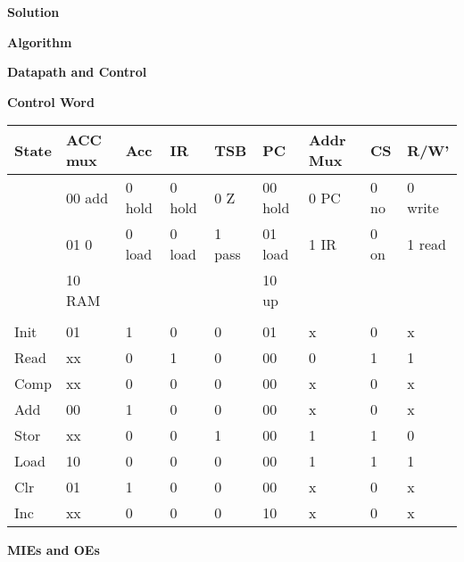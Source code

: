 \begin{enumerate}
\begin{onlysolution}  \textbf{Solution} \itshape{ 

\textbf{ Algorithm}

\textbf{ Datapath and Control}

\begin{figure}[ht]
\end{figure}

\textbf{ Control Word}

\tiny{
\begin{tabular}{l|l|l|l|l|l|l|l|l}
State & ACC mux	& Acc   & IR    & TSB   & PC	    & Addr Mux & CS	& R/W'	\\ \hline
      & 00 add & 0 hold & 0 hold & 0 Z    & 00 hold & 0 PC	& 0 no & 0 write \\ \hline
      & 01 0   & 0 load & 0 load & 1 pass & 01 load & 1 IR	& 0 on & 1 read \\ \hline
      & 10 RAM & 	& 	& 	& 10 up	&	 	& 	 & 	\\ \hline
      & 	& 	& 	& 	& 	& 	 	& 	 & 	\\ \hline
Init  &	01	& 1	& 0	& 0	& 01	&	x	& 0	& x	\\ \hline
Read  & xx	& 0	& 1	& 0	& 00	&	0	& 1	& 1	\\ \hline
Comp  & xx	& 0	& 0	& 0	& 00	&	x	& 0	& x	\\ \hline
Add   & 00	& 1	& 0	& 0	& 00	&	x	& 0	& x	\\ \hline
Stor  & xx	& 0	& 0	& 1	& 00	&	1	& 1	& 0	\\ \hline
Load  & 10	& 0	& 0	& 0	& 00	&	1	& 1	& 1	\\ \hline
Clr   & 01	& 1	& 0	& 0	& 00	&	x	& 0	& x	\\ \hline
Inc   & xx	& 0	& 0	& 0	& 10	&	x	& 0	& x	\\ 
\end{tabular}
}


\textbf{ MIEs and OEs}

}
\end{onlysolution}
\end{enumerate}
